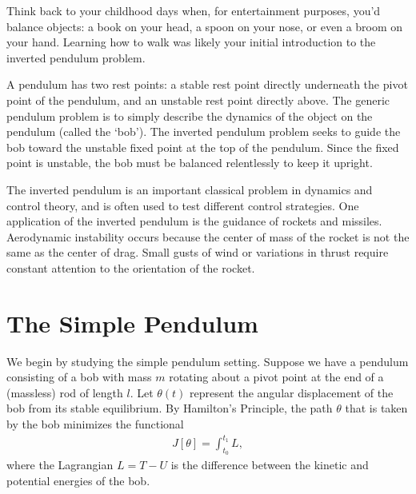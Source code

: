 \label{lab:inverted_pendulum}



Think back to your childhood days when, for entertainment purposes, you'd balance objects: a book on your head, a spoon on your nose, or even a broom on your hand.
 Learning how to walk was likely your initial introduction to the inverted pendulum problem.

A pendulum has two rest points: a stable rest point directly underneath the pivot point of the pendulum, and an unstable rest point directly above. 
The generic pendulum problem is to simply describe the dynamics of the object on the pendulum (called the `bob').
The inverted pendulum problem seeks to guide the bob toward the unstable fixed point at the top of the pendulum. 
Since the fixed point is unstable, the bob must be balanced relentlessly to keep it upright. 

The inverted pendulum is an important classical problem in dynamics and control theory, and is often used to test different control strategies. One application of the inverted pendulum is the guidance of rockets and missiles. Aerodynamic instability occurs because the center of mass of the rocket is not the same as the center of drag. Small gusts of wind or variations in thrust require constant attention to the orientation of the rocket. 


\section*{The Simple Pendulum}
We begin by studying the simple pendulum setting. 
Suppose we have a pendulum consisting of a bob with mass $m$ rotating about a pivot point at the end of a (massless) rod of length $l$. 
Let $\theta(t)$ represent the angular displacement of the bob from its stable equilibrium.
By Hamilton's Principle, the path $\theta$ that is taken by the bob minimizes the functional 
\begin{align}
J[\theta] = \int_{t_0}^{t_1}	L,
\end{align}
where the Lagrangian $L = T - U$ is the difference between the kinetic and potential energies of the bob. 

